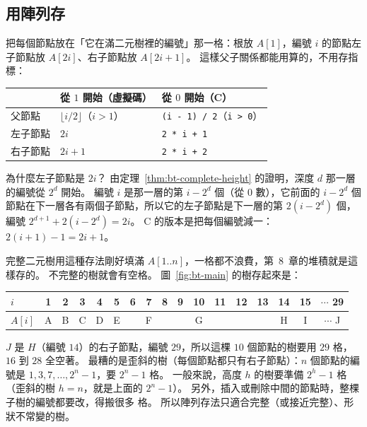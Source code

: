 \subsection{用陣列存}
\label{sec:bt-array}

把每個節點放在「它在滿二元樹裡的編號」那一格：根放 $A[1]$，編號 $i$ 的節點左子節點放
$A[2i]$、右子節點放 $A[2i + 1]$。 這樣父子關係都能用算的，不用存指標：

\begin{center}
\begin{tabular}{lll}
\toprule
 & 從 $1$ 開始（虛擬碼） & 從 $0$ 開始（C） \\
\midrule
父節點 & $\lfloor i / 2 \rfloor$（$i > 1$）& \texttt{(i - 1) / 2}（\texttt{i > 0}）\\
左子節點 & $2i$ & \texttt{2 * i + 1} \\
右子節點 & $2i + 1$ & \texttt{2 * i + 2} \\
\bottomrule
\end{tabular}
\end{center}

為什麼左子節點是 $2i$？ 由定理~\ref{thm:bt-complete-height} 的證明，深度 $d$ 那一層
的編號從 $2^d$ 開始。 編號 $i$ 是那一層的第 $i - 2^d$ 個（從 $0$ 數），它前面的
$i - 2^d$ 個節點在下一層各有兩個子節點，所以它的左子節點是下一層的第 $2(i - 2^d)$ 個，
編號 $2^{d+1} + 2(i - 2^d) = 2i$。 C 的版本是把每個編號減一：$2(i + 1) - 1 = 2i + 1$。

完整二元樹用這種存法剛好填滿 $A[1..n]$，一格都不浪費，第~8~章的堆積就是這樣存的。
不完整的樹就會有空格。 圖~\ref{fig:bt-main} 的樹存起來是：

\begin{center}
\setlength{\tabcolsep}{4pt}
\begin{tabular}{l*{15}{c}c}
\toprule
$i$ & 1 & 2 & 3 & 4 & 5 & 6 & 7 & 8 & 9 & 10 & 11 & 12 & 13 & 14 & 15 & $\cdots$ 29 \\
\midrule
$A[i]$ & A & B & C & D & E & & F & & & G & & & & H & I & $\cdots$ J \\
\bottomrule
\end{tabular}
\end{center}

$J$ 是 $H$（編號 $14$）的右子節點，編號 $29$，所以這棵 $10$ 個節點的樹要用 $29$ 格，
$16$ 到 $28$ 全空著。 最糟的是歪斜的樹（每個節點都只有右子節點）：$n$ 個節點的編號是
$1, 3, 7, \ldots, 2^n - 1$，要 $2^n - 1$ 格。 一般來說，高度 $h$ 的樹要準備
$2^h - 1$ 格（歪斜的樹 $h = n$，就是上面的 $2^n - 1$）。 另外，插入或刪除中間的節點時，整棵子樹的編號都要改，得搬很多
格。 所以陣列存法只適合完整（或接近完整）、形狀不常變的樹。

